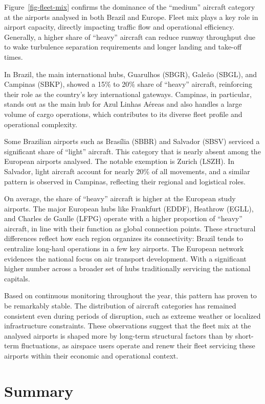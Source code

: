 \documentclass[
  a4paper,
  DIV=11,
  numbers=noendperiod]{scrreport}
\begin{document}
Figure~\ref{fig-fleet-mix} confirms the dominance of the ``medium''
aircraft category at the airports analysed in both Brazil and Europe.
Fleet mix plays a key role in airport capacity, directly impacting
traffic flow and operational efficiency. Generally, a higher share of
``heavy'' aircraft can reduce runway throughput due to wake turbulence
separation requirements and longer landing and take-off times.

In Brazil, the main international hubs, Guarulhos (SBGR), Galeão (SBGL),
and Campinas (SBKP), showed a 15\% to 20\% share of ``heavy'' aircraft,
reinforcing their role as the country's key international gateways.
Campinas, in particular, stands out as the main hub for Azul Linhas
Aéreas and also handles a large volume of cargo operations, which
contributes to its diverse fleet profile and operational complexity.

Some Brazilian airports such as Brasília (SBBR) and Salvador (SBSV)
serviced a significant share of ``light'' aircraft. This category that
is nearly absent among the European airports analysed. The notable
exemption is Zurich (LSZH). In Salvador, light aircraft account for
nearly 20\% of all movements, and a similar pattern is observed in
Campinas, reflecting their regional and logistical roles.

On average, the share of ``heavy'' aircraft is higher at the European
study airports. The major European hubs like Frankfurt (EDDF), Heathrow
(EGLL), and Charles de Gaulle (LFPG) operate with a higher proportion of
``heavy'' aircraft, in line with their function as global connection
points. These structural differences reflect how each region organizes
its connectivity: Brazil tends to centralize long-haul operations in a
few key airports. The European network evidences the national focus on
air transport development. With a significant higher number across a
broader set of hubs traditionally servicing the national capitals.

Based on continuous monitoring throughout the year, this pattern has
proven to be remarkably stable. The distribution of aircraft categories
has remained consistent even during periods of disruption, such as
extreme weather or localized infrastructure constraints. These
observations suggest that the fleet mix at the analysed airports is
shaped more by long-term structural factors than by short-term
fluctuations, as airspace users operate and renew their fleet servicing
these airports within their economic and operational context.

\section{Summary}\label{summary-1}
\end{document}
